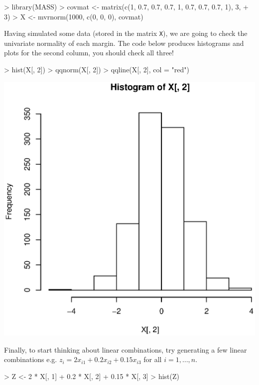 \begin{Schunk}
\begin{Sinput}
> library(MASS)
> covmat <- matrix(c(1, 0.7, 0.7, 0.7, 1, 0.7, 0.7, 0.7, 1), 3, 
+     3)
> X <- mvrnorm(1000, c(0, 0, 0), covmat)
\end{Sinput}
\end{Schunk}


Having simulated some data (stored in the matrix \texttt{X}), we are going to check the univariate normality of each margin.   The code below produces histograms and plots for the second column, you should check all three!

\begin{Schunk}
\begin{Sinput}
> hist(X[, 2])
> qqnorm(X[, 2])
> qqline(X[, 2], col = "red")
\end{Sinput}
\end{Schunk}
\includegraphics{week1-uvnorm}

Finally, to start thinking about linear combinations, try generating a few linear combinations e.g. $z_{i} = 2x_{i1}+0.2x_{i2}+0.15x_{i3}$ for all $i = 1, \ldots, n$.

\begin{Schunk}
\begin{Sinput}
> Z <- 2 * X[, 1] + 0.2 * X[, 2] + 0.15 * X[, 3]
> hist(Z)
\end{Sinput}
\end{Schunk}

